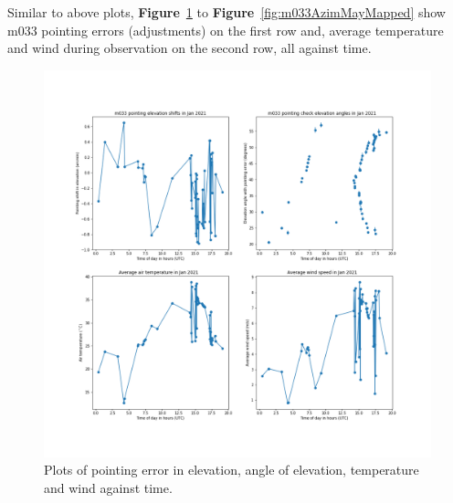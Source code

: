 \documentclass{article}
\begin{document}
Similar to above plots, \textbf{Figure}~\ref{fig:m033ElevJanMapped} to \textbf{Figure}~\ref{fig:m033AzimMayMapped} show m033 pointing errors (adjustments) on the first row and, average temperature and wind during observation on the second row, all against time.    

\begin{figure}[H]
	\includegraphics[scale=0.45]{m033_elev_Jan_mapped.png}
	
	\caption{Plots of pointing error in elevation, angle of elevation, temperature and wind against time.}
	\label{fig:m033ElevJanMapped}
\end{figure}
\end{document}
